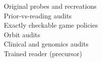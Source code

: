 Original probes and recreations \citep{takehi2026sparks,zen23954378}\\ Prior-vs-reading audits \citep{ax2611_08070,zen24373915}\\ Exactly checkable game policies \citep{ax2611_31979}\\ Orbit audits \citep{ax2611_05798}\\ Clinical and genomics audits \citep{ax2611_05341,ax2611_07847,zen24040591}\\ Trained reader (precursor) \citep{ax2610_07334}
